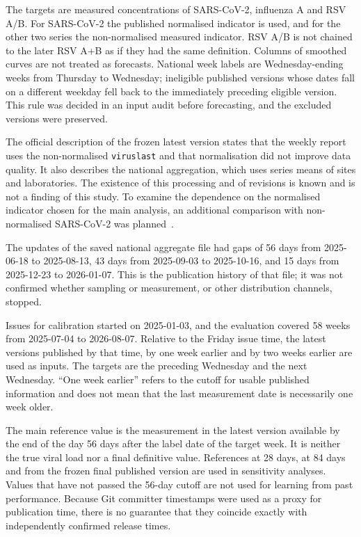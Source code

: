 \documentclass[11pt]{article}
\begin{document}
The targets are measured concentrations of SARS-CoV-2, influenza A and RSV A/B. For SARS-CoV-2 the published normalised indicator is used, and for the other two series the non-normalised measured indicator. RSV A/B is not chained to the later RSV A+B as if they had the same definition. Columns of smoothed curves are not treated as forecasts. National week labels are Wednesday-ending weeks from Thursday to Wednesday; ineligible published versions whose dates fall on a different weekday fell back to the immediately preceding eligible version. This rule was decided in an input audit before forecasting, and the excluded versions were preserved.

The official description of the frozen latest version states that the weekly report uses the non-normalised \texttt{viruslast} and that normalisation did not improve data quality. It also describes the national aggregation, which uses series means of sites and laboratories. The existence of this processing and of revisions is known and is not a finding of this study. To examine the dependence on the normalised indicator chosen for the main analysis, an additional comparison with non-normalised SARS-CoV-2 was planned~\cite{amelagreadme}.

The updates of the saved national aggregate file had gaps of 56 days from 2025-06-18 to 2025-08-13, 43 days from 2025-09-03 to 2025-10-16, and 15 days from 2025-12-23 to 2026-01-07. This is the publication history of that file; it was not confirmed whether sampling or measurement, or other distribution channels, stopped.

Issues for calibration started on 2025-01-03, and the evaluation covered 58 weeks from 2025-07-04 to 2026-08-07. Relative to the Friday issue time, the latest versions published by that time, by one week earlier and by two weeks earlier are used as inputs. The targets are the preceding Wednesday and the next Wednesday. ``One week earlier'' refers to the cutoff for usable published information and does not mean that the last measurement date is necessarily one week older.

The main reference value is the measurement in the latest version available by the end of the day 56 days after the label date of the target week. It is neither the true viral load nor a final definitive value. References at 28 days, at 84 days and from the frozen final published version are used in sensitivity analyses. Values that have not passed the 56-day cutoff are not used for learning from past performance. Because Git committer timestamps were used as a proxy for publication time, there is no guarantee that they coincide exactly with independently confirmed release times.
\end{document}
